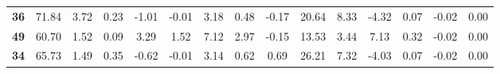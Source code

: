 \documentclass[withoutpreface,bwprint]{cumcmthesis} %
\begin{document}
\begin{appendices}
\begin{table}[!h]
\begin{tabular}{@{}ccccccccccccccc@{}}
			\textbf{36}      & 71.84                                                          & 3.72                                                          & 0.23                                                         & -1.01                                                        & -0.01                                                        & 3.18                                                           & 0.48                                                           & -0.17                                                        & 20.64                                                        & 8.33                                                         & -4.32                                                           & 0.07                                                         & -0.02                                                         & 0.00                                                          \\
			\textbf{49}      & 60.70                                                          & 1.52                                                          & 0.09                                                         & 3.29                                                         & 1.52                                                         & 7.12                                                           & 2.97                                                           & -0.15                                                        & 13.53                                                        & 3.44                                                         & 7.13                                                            & 0.32                                                         & -0.02                                                         & 0.00                                                          \\
			\textbf{34}      & 65.73                                                          & 1.49                                                          & 0.35                                                         & -0.62                                                        & -0.01                                                        & 3.14                                                           & 0.62                                                           & 0.69                                                         & 26.21                                                        & 7.32                                                         & -4.03                                                           & 0.07                                                         & -0.02                                                         & 0.00                                                          \\

\end{tabular}
\end{table}
\end{appendices}
\end{document}
